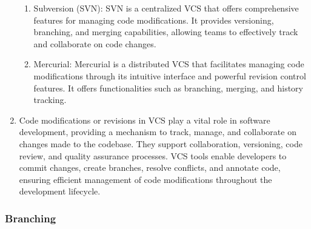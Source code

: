 \begin{enumerate}
\begin{enumerate}
        \item Subversion (SVN): SVN is a centralized VCS that offers comprehensive features for managing code modifications. It provides versioning, branching, and merging capabilities, allowing teams to effectively track and collaborate on code changes.

        \item Mercurial: Mercurial is a distributed VCS that facilitates managing code modifications through its intuitive interface and powerful revision control features. It offers functionalities such as branching, merging, and history tracking.
    \end{enumerate}
    \item Code modifications or revisions in VCS play a vital role in software development, providing a mechanism to track, manage, and collaborate on changes made to the codebase. They support collaboration, versioning, code review, and quality assurance processes. VCS tools enable developers to commit changes, create branches, resolve conflicts, and annotate code, ensuring efficient management of code modifications throughout the development lifecycle.
\end{enumerate}

\subsubsection*{Branching}


